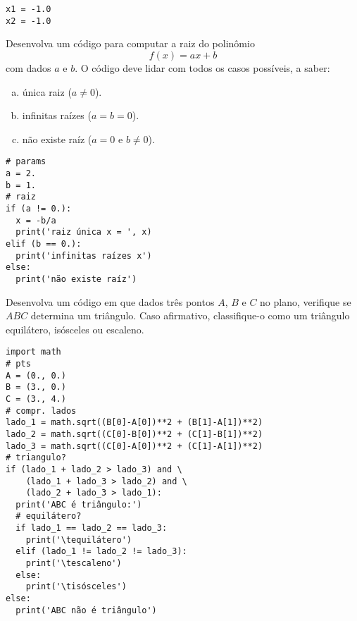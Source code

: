 \begin{verbatim}
x1 = -1.0
x2 = -1.0
\end{verbatim}

\begin{exer}
  Desenvolva um código para computar a raiz do polinômio
  \begin{equation}
    f(x) = ax + b
  \end{equation}
  com dados $a$ e $b$. O código deve lidar com todos os casos possíveis, a saber:
  \begin{enumerate}[a)]
    \item única raiz ($a\neq 0$).
    \item infinitas raízes ($a=b=0$).
    \item não existe raíz ($a = 0$ e $b \neq 0$).
  \end{enumerate}
\end{exer}
\begin{resp}

\begin{lstlisting}
# params
a = 2.
b = 1.
# raiz
if (a != 0.):
  x = -b/a
  print('raiz única x = ', x)
elif (b == 0.):
  print('infinitas raízes x')
else:
  print('não existe raíz')
\end{lstlisting}

\end{resp}

\begin{exer}
  Desenvolva um código em que dados três pontos $A$, $B$ e $C$ no plano, verifique se $ABC$ determina um triângulo. Caso afirmativo, classifique-o como um triângulo equilátero, isósceles ou escaleno.
\end{exer}
\begin{resp}

\begin{lstlisting}
import math
# pts
A = (0., 0.)
B = (3., 0.)
C = (3., 4.)
# compr. lados
lado_1 = math.sqrt((B[0]-A[0])**2 + (B[1]-A[1])**2)
lado_2 = math.sqrt((C[0]-B[0])**2 + (C[1]-B[1])**2)
lado_3 = math.sqrt((C[0]-A[0])**2 + (C[1]-A[1])**2)
# triangulo?
if (lado_1 + lado_2 > lado_3) and \
    (lado_1 + lado_3 > lado_2) and \
    (lado_2 + lado_3 > lado_1):
  print('ABC é triângulo:')
  # equilátero?
  if lado_1 == lado_2 == lado_3:
    print('\tequilátero')
  elif (lado_1 != lado_2 != lado_3):
    print('\tescaleno')
  else:
    print('\tisósceles')
else:
  print('ABC não é triângulo')
\end{lstlisting}

\end{resp}

